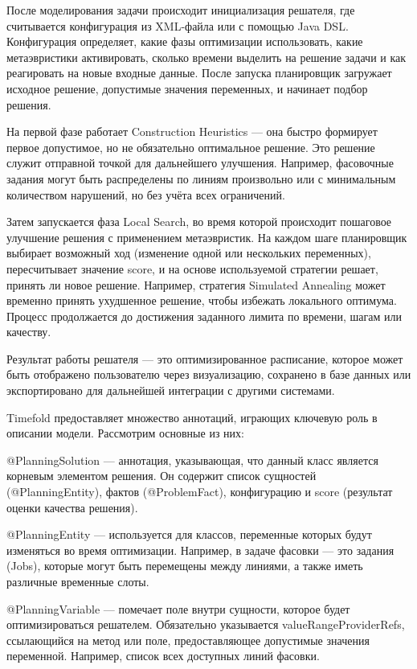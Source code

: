 После моделирования задачи происходит инициализация решателя, где считывается конфигурация из XML-файла или с помощью Java DSL. Конфигурация определяет, какие фазы оптимизации использовать, какие метаэвристики активировать, сколько времени выделить на решение задачи и как реагировать на новые входные данные. После запуска планировщик загружает исходное решение, допустимые значения переменных, и начинает подбор решения.

На первой фазе работает Construction Heuristics — она быстро формирует первое допустимое, но не обязательно оптимальное решение. Это решение служит отправной точкой для дальнейшего улучшения. Например, фасовочные задания могут быть распределены по линиям произвольно или с минимальным количеством нарушений, но без учёта всех ограничений.

Затем запускается фаза Local Search, во время которой происходит пошаговое улучшение решения с применением метаэвристик. На каждом шаге планировщик выбирает возможный ход (изменение одной или нескольких переменных), пересчитывает значение score, и на основе используемой стратегии решает, принять ли новое решение. Например, стратегия Simulated Annealing может временно принять ухудшенное решение, чтобы избежать локального оптимума. Процесс продолжается до достижения заданного лимита по времени, шагам или качеству. \cite{timefold2025docs}

Результат работы решателя — это оптимизированное расписание, которое может быть отображено пользователю через визуализацию, сохранено в базе данных или экспортировано для дальнейшей интеграции с другими системами.

Timefold предоставляет множество аннотаций, играющих ключевую роль в описании модели. Рассмотрим основные из них:

@PlanningSolution — аннотация, указывающая, что данный класс является корневым элементом решения. Он содержит список сущностей (@PlanningEntity), фактов (@ProblemFact), конфигурацию и score (результат оценки качества решения).

@PlanningEntity — используется для классов, переменные которых будут изменяться во время оптимизации. Например, в задаче фасовки — это задания (Jobs), которые могут быть перемещены между линиями, а также иметь различные временные слоты.

@PlanningVariable — помечает поле внутри сущности, которое будет оптимизироваться решателем. Обязательно указывается valueRangeProviderRefs, ссылающийся на метод или поле, предоставляющее допустимые значения переменной. Например, список всех доступных линий фасовки.

